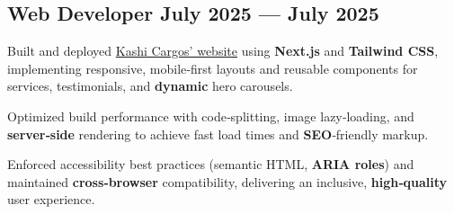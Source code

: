 \subsection{{Web Developer \hfill July 2025 --- July 2025}}
\begin{zitemize}
\item Built and deployed \href{https://www.kashicargos.com/}{Kashi Cargos’ website} using \textbf{Next.js} and \textbf{Tailwind CSS}, implementing responsive, mobile‑first layouts and reusable components for services, testimonials, and \textbf{dynamic} hero carousels.
\item Optimized build performance with code‑splitting, image lazy‑loading, and \textbf{server‑side} rendering to achieve fast load times and \textbf{SEO}‑friendly markup.
\item Enforced accessibility best practices (semantic HTML, \textbf{ARIA roles}) and maintained \textbf{cross‑browser} compatibility, delivering an inclusive, \textbf{high‑quality} user experience.
\end{zitemize}



